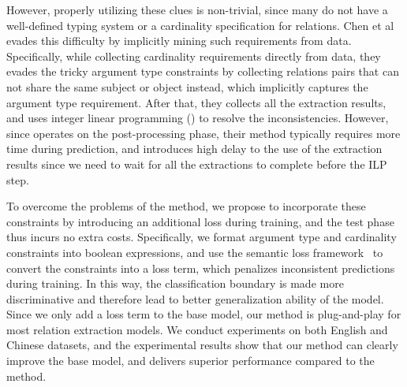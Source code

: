 However, properly utilizing these clues is non-trivial, since many \KBs do not have a well-defined typing system or a cardinality specification for relations.
Chen et al~ evades this difficulty by implicitly mining such requirements from data.
Specifically, while collecting cardinality requirements directly from data, they evades the tricky argument type constraints by collecting relations pairs that can not share the same subject or object instead, which implicitly captures the argument type requirement.
After that, they collects all the extraction results, and uses integer linear programming (\ILP) to resolve the inconsistencies.
However, since \ILP operates on the post-processing phase, their method typically requires more time during prediction, and introduces high delay to the use of the extraction results since we need to wait for all the extractions to complete before the ILP step.

To overcome the problems of the \ILP method, we propose to incorporate these constraints by introducing an additional loss during training, and the test phase thus incurs no extra costs.
Specifically, we format argument type and cardinality constraints into boolean expressions, and use the semantic loss framework~\cite{xu2017semantic} to convert the constraints into a loss term, which penalizes inconsistent predictions during training.
In this way, the classification boundary is made more discriminative and therefore lead to better generalization ability of the model.
Since we only add a loss term to the base model, our method is plug-and-play for most relation extraction models.
We conduct experiments on both English and Chinese datasets,
and the experimental results show that our method can clearly improve the base model, and delivers superior performance compared to the \ILP method.

